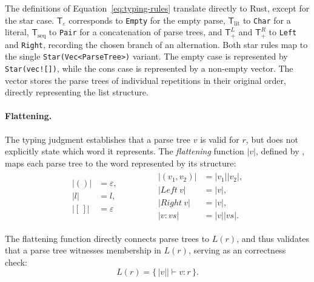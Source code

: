 The definitions of Equation~\eqref{eq:typing-rules} translate directly to Rust, 
except for the star case.
$\mathsf{T}_{\varepsilon}$ corresponds to \texttt{Empty} for the empty parse, 
$\mathsf{T}_{\mathrm{lit}}$ to \texttt{Char} for a literal,
$\mathsf{T}_{\mathrm{seq}}$ to \texttt{Pair} for a concatenation of parse trees, and 
$\mathsf{T}_{+}^{L}$ and $\mathsf{T}_{+}^{R}$ to \texttt{Left} and \texttt{Right}, 
recording the chosen branch of an alternation. 
Both star rules map to the single \texttt{Star(Vec<ParseTree>)}
variant. The empty case is represented by \texttt{Star(vec![])},
while the cons case is represented by a non-empty vector.
The vector stores the parse trees of individual repetitions
in their original order, directly representing the list structure.

%

\paragraph{Flattening.}
The typing judgment establishes that a parse tree $v$ is valid for
$r$, but does not explicitly state which word it represents.
The \emph{flattening} function $|v|$, defined by \citep[Fig.~1]{sulzmannlu2014},
maps each parse tree to the word represented by its structure:
\begin{equation}
\label{eq:flatten}
\begin{aligned}
\begin{aligned}
\lvert ()\rvert
  &= \varepsilon,
\\
\lvert l\rvert
  &= l,
\\
\lvert [\,]\rvert
  &= \varepsilon
\end{aligned}
\qquad\qquad
\begin{aligned}
\lvert (v_1,v_2)\rvert
  &= \lvert v_1\rvert\lvert v_2\rvert,
\\
\lvert \mathit{Left}\ v\rvert
  &= \lvert v\rvert,
\\
\lvert \mathit{Right}\ v\rvert
  &= \lvert v\rvert,
\\
\lvert v:vs\rvert
  &= \lvert v\rvert\lvert vs\rvert.
\end{aligned}
\end{aligned}
\end{equation}

The flattening function directly connects parse trees to $L(r)$,
and thus validates that a parse tree witnesses membership in $L(r)$,
serving as an correctness check:
\begin{equation}\label{eq:mvp-5}
L(r)
=
\{\,\lvert v\rvert \mid \vdash v : r\,\}.
\end{equation}

